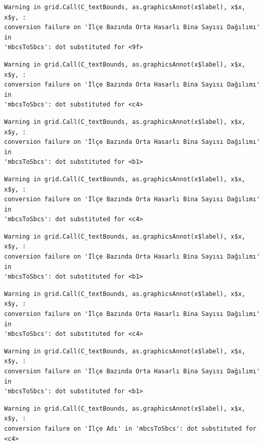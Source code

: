 \documentclass[
  11pt,
  a4paper,
  DIV=11,
  numbers=noendperiod]{scrartcl}
\begin{document}
\begin{verbatim}
Warning in grid.Call(C_textBounds, as.graphicsAnnot(x$label), x$x, x$y, :
conversion failure on 'İlçe Bazında Orta Hasarlı Bina Sayısı Dağılımı' in
'mbcsToSbcs': dot substituted for <9f>
\end{verbatim}

\begin{verbatim}
Warning in grid.Call(C_textBounds, as.graphicsAnnot(x$label), x$x, x$y, :
conversion failure on 'İlçe Bazında Orta Hasarlı Bina Sayısı Dağılımı' in
'mbcsToSbcs': dot substituted for <c4>
\end{verbatim}

\begin{verbatim}
Warning in grid.Call(C_textBounds, as.graphicsAnnot(x$label), x$x, x$y, :
conversion failure on 'İlçe Bazında Orta Hasarlı Bina Sayısı Dağılımı' in
'mbcsToSbcs': dot substituted for <b1>
\end{verbatim}

\begin{verbatim}
Warning in grid.Call(C_textBounds, as.graphicsAnnot(x$label), x$x, x$y, :
conversion failure on 'İlçe Bazında Orta Hasarlı Bina Sayısı Dağılımı' in
'mbcsToSbcs': dot substituted for <c4>
\end{verbatim}

\begin{verbatim}
Warning in grid.Call(C_textBounds, as.graphicsAnnot(x$label), x$x, x$y, :
conversion failure on 'İlçe Bazında Orta Hasarlı Bina Sayısı Dağılımı' in
'mbcsToSbcs': dot substituted for <b1>
\end{verbatim}

\begin{verbatim}
Warning in grid.Call(C_textBounds, as.graphicsAnnot(x$label), x$x, x$y, :
conversion failure on 'İlçe Bazında Orta Hasarlı Bina Sayısı Dağılımı' in
'mbcsToSbcs': dot substituted for <c4>
\end{verbatim}

\begin{verbatim}
Warning in grid.Call(C_textBounds, as.graphicsAnnot(x$label), x$x, x$y, :
conversion failure on 'İlçe Bazında Orta Hasarlı Bina Sayısı Dağılımı' in
'mbcsToSbcs': dot substituted for <b1>
\end{verbatim}

\begin{verbatim}
Warning in grid.Call(C_textBounds, as.graphicsAnnot(x$label), x$x, x$y, :
conversion failure on 'İlçe Adı' in 'mbcsToSbcs': dot substituted for <c4>
\end{verbatim}
\end{document}
